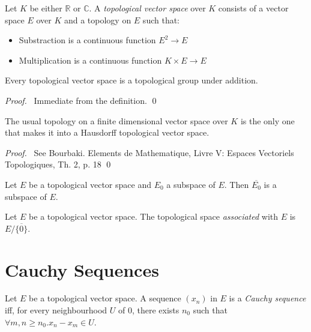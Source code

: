 \begin{df}
Let $K$ be either $\mathbb{R}$ or $\mathbb{C}$. A \emph{topological vector space} over $K$ consists of a 	vector space $E$ over $K$ and a topology on $E$ such that:
\begin{itemize}
\item Substraction is a continuous function $E^2 \rightarrow E$
\item Multiplication is a continuous function $K \times E \rightarrow E$
\end{itemize}
\end{df}

\begin{prop}
Every topological vector space is a topological group under addition.
\end{prop}

\begin{proof}
\pf\ Immediate from the definition. \qed
\end{proof}

\begin{thm}
The usual topology on a finite dimensional vector space over $K$ is the only one that makes it into a Hausdorff topological vector space.
\end{thm}

\begin{proof}
\pf\ See Bourbaki. Elements de Mathematique, Livre V: Espaces Vectoriels Topologiques, Th. 2, p. 18 \qed
\end{proof}

\begin{prop}
Let $E$ be a topological vector space and $E_0$ a subspace of $E$. Then $\overline{E_0}$ is a subspace of $E$.
\end{prop}

\begin{df}
Let $E$ be a topological vector space. The topological space \emph{associated} with $E$ is $E / \overline{\{0\}}$.
\end{df}

\section{Cauchy Sequences}

\begin{df}
Let $E$ be a topological vector space. A sequence $(x_n)$ in $E$ is a \emph{Cauchy sequence} iff, for every neighbourhood $U$ of 0, there exists $n_0$ such that $\forall m,n \geq n_0. x_n - x_m \in U$.
\end{df}


